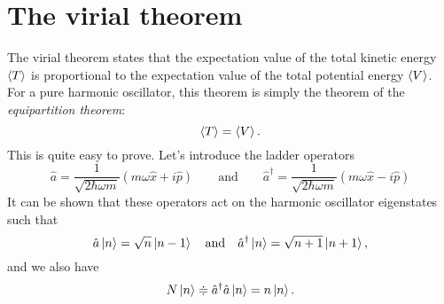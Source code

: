 
\graphicspath{{Mainmatter/figures/PNG/}{Mainmatter/figures/PDF/}{Mainmatter/figures/}}

\chapter{The virial theorem}
\label{sec:virial}

The virial theorem states that the expectation value of the total kinetic energy $\Braket{T}$ is proportional to the expectation value of the total potential energy $\Braket{V}$. For a pure harmonic oscillator, this theorem is simply the theorem of the \emph{equipartition theorem}:
\begin{equation}
	\Braket{T} = \Braket{V}.
\end{equation}
This is quite easy to prove. Let's introduce the ladder operators
\begin{equation}
	\hat{a}=\frac{1}{\sqrt{2 \hbar \omega m}} \left( m \omega \hat{x}+ i \hat{p} \right)
	\qquad \text{and} \qquad
	\hat{a}^{\dagger}=\frac{1}{\sqrt{2 \hbar \omega m}} \left( m \omega \hat{x}- i \hat{p} \right)
\end{equation}
It can be shown that these operators act on the harmonic oscillator eigenstates such that
\begin{equation}
	\hat{a} \Ket{n} =\sqrt{n} \Ket{n-1}
	\quad \text{and} \quad 
	\hat{a}^{\dagger} \Ket{n} =\sqrt{n+1} \Ket{n+1},
\end{equation}
and we also have
\begin{equation}
	N\Ket{n} \doteqdot \hat{a}^{\dagger}\hat{a}\Ket{n} = n\Ket{n}.
\end{equation}

